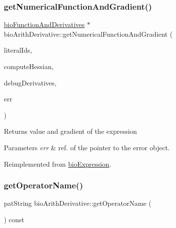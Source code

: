 \mbox{\label{classbio_arith_derivative_afaa0e62675cc46145231f3e01d38f06a}} 
\subsubsection{\texorpdfstring{get\+Numerical\+Function\+And\+Gradient()}{getNumericalFunctionAndGradient()}}
{\footnotesize\ttfamily \hyperlink{classbio_function_and_derivatives}{bio\+Function\+And\+Derivatives} $\ast$ bio\+Arith\+Derivative\+::get\+Numerical\+Function\+And\+Gradient (\begin{DoxyParamCaption}\item[{vector$<$ pat\+U\+Long $>$}]{literal\+Ids,  }\item[{pat\+Boolean}]{compute\+Hessian,  }\item[{pat\+Boolean}]{debug\+Derivatives,  }\item[{pat\+Error $\ast$\&}]{err }\end{DoxyParamCaption})\hspace{0.3cm}{\ttfamily [virtual]}}

\begin{DoxyReturn}{Returns}
value and gradient of the expression 
\end{DoxyReturn}

\begin{DoxyParams}{Parameters}
{\em err} & ref. of the pointer to the error object. \\
\hline
\end{DoxyParams}


Reimplemented from \hyperlink{classbio_expression_a91c81ce80c9e972c913b10f5f3c1ed13}{bio\+Expression}.

\mbox{\label{classbio_arith_derivative_ac8efdaec7482845045144e134884769a}} 
\subsubsection{\texorpdfstring{get\+Operator\+Name()}{getOperatorName()}}
{\footnotesize\ttfamily pat\+String bio\+Arith\+Derivative\+::get\+Operator\+Name (\begin{DoxyParamCaption}{ }\end{DoxyParamCaption}) const\hspace{0.3cm}{\ttfamily [virtual]}}

